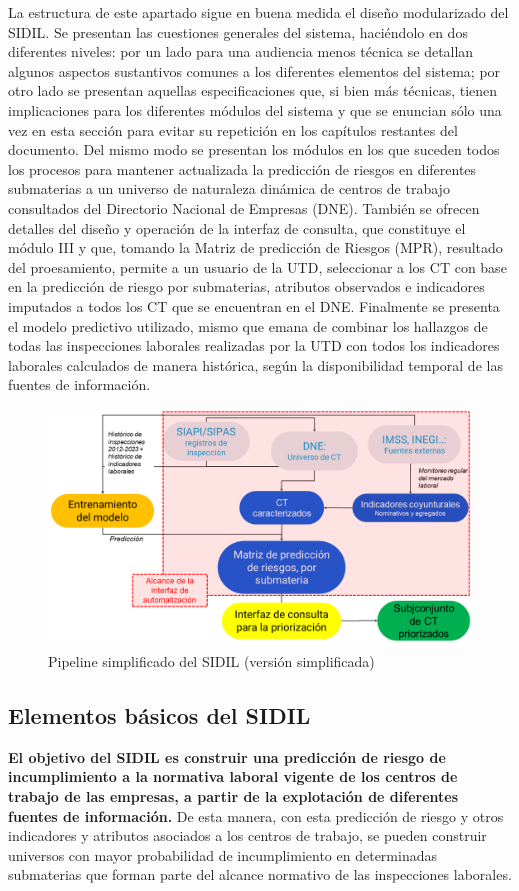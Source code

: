\documentclass[
]{article}
\begin{document}
La estructura de este apartado sigue en buena medida el diseño modularizado del SIDIL. Se presentan las cuestiones generales del sistema, haciéndolo en dos diferentes niveles: por un lado para una audiencia menos técnica se detallan algunos aspectos sustantivos comunes a los diferentes elementos del sistema; por otro lado se presentan aquellas especificaciones que, si bien más técnicas, tienen implicaciones para los diferentes módulos del sistema y que se enuncian sólo una vez en esta sección para evitar su repetición en los capítulos restantes del documento. Del mismo modo se presentan los módulos en los que suceden todos los procesos para mantener actualizada la predicción de riesgos en diferentes submaterias a un universo de naturaleza dinámica de centros de trabajo consultados del Directorio Nacional de Empresas (DNE). También se ofrecen detalles del diseño y operación de la interfaz de consulta, que constituye el módulo III y que, tomando la Matriz de predicción de Riesgos (MPR), resultado del proesamiento, permite a un usuario de la UTD, seleccionar a los CT con base en la predicción de riesgo por submaterias, atributos observados e indicadores imputados a todos los CT que se encuentran en el DNE. Finalmente se presenta el modelo predictivo utilizado, mismo que emana de combinar los hallazgos de todas las inspecciones laborales realizadas por la UTD con todos los indicadores laborales calculados de manera histórica, según la disponibilidad temporal de las fuentes de información.

\begin{figure}
\includegraphics[width=0.5\linewidth]{images-1/02/image2_alternativaTD} \caption{Pipeline simplificado del SIDIL  (versión simplificada)}\label{fig:pipelsimplaaificado2}
\end{figure}

\hypertarget{elementos-buxe1sicos-del-sidil}{%
\subsection{Elementos básicos del SIDIL}\label{elementos-buxe1sicos-del-sidil}}

\textbf{El objetivo del SIDIL es construir una predicción de riesgo de incumplimiento a la normativa laboral vigente de los centros de trabajo de las empresas, a partir de la explotación de diferentes fuentes de información.} De esta manera, con esta predicción de riesgo y otros indicadores y atributos asociados a los centros de trabajo, se pueden construir universos con mayor probabilidad de incumplimiento en determinadas submaterias que forman parte del alcance normativo de las inspecciones laborales.
\end{document}

